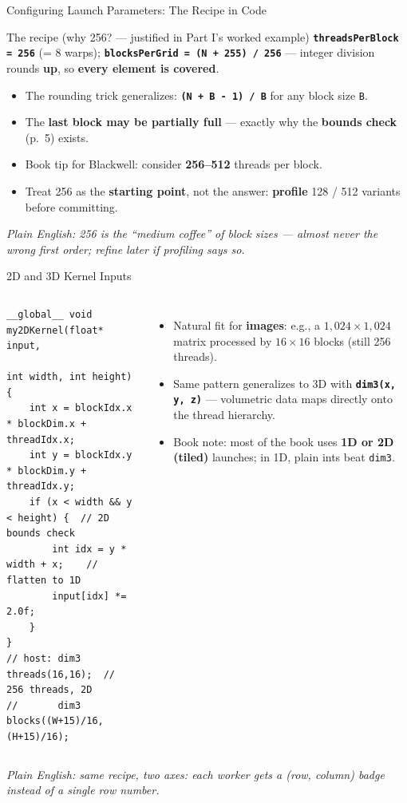 \documentclass[aspectratio=169]{beamer}
\newcommand{\kw}[1]{\textbf{\textcolor{kwblue}{#1}}}
\newcommand{\pe}[1]{\par{\setlength{\fboxsep}{2.5pt}\noindent\colorbox{navy!9}{\parbox{\dimexpr\textwidth-5pt\relax}{\footnotesize\itshape Plain English: #1}}}}
\begin{document}
\begin{frame}{Configuring Launch Parameters: The Recipe in Code}
  \begin{block}{The recipe (why 256? --- justified in Part I's worked example)}
    \kw{\texttt{threadsPerBlock = 256}} (= 8 warps);\quad
    \kw{\texttt{blocksPerGrid = (N + 255) / 256}} --- integer division rounds \kw{up},
    so \kw{every element is covered}.
  \end{block}
  \begin{itemize}
    \item The rounding trick generalizes: \kw{\texttt{(N + B - 1) / B}} for any block size \texttt{B}.
    \item The \kw{last block may be partially full} --- exactly why the
          \kw{bounds check} (p.~5) exists.
    \item Book tip for Blackwell: consider \kw{256--512} threads per block.
    \item Treat 256 as the \kw{starting point}, not the answer:
          \kw{profile} 128 / 512 variants before committing.
  \end{itemize}
  \pe{256 is the ``medium coffee'' of block sizes --- almost never the wrong first order; refine later if profiling says so.}
\end{frame}
\begin{frame}[fragile]{2D and 3D Kernel Inputs}
  \begin{columns}[t]
\begin{lstlisting}
__global__ void my2DKernel(float* input,
                           int width, int height) {
    int x = blockIdx.x * blockDim.x + threadIdx.x;
    int y = blockIdx.y * blockDim.y + threadIdx.y;
    if (x < width && y < height) {  // 2D bounds check
        int idx = y * width + x;    // flatten to 1D
        input[idx] *= 2.0f;
    }
}
// host: dim3 threads(16,16);  // 256 threads, 2D
//       dim3 blocks((W+15)/16, (H+15)/16);
\end{lstlisting}
    \begin{itemize}
      \item Natural fit for \kw{images}: e.g., a $1{,}024 \times 1{,}024$ matrix processed by
            $16 \times 16$ blocks (still 256 threads).
      \item Same pattern generalizes to 3D with \kw{\texttt{dim3(x, y, z)}} ---
            volumetric data maps directly onto the thread hierarchy.
      \item Book note: most of the book uses \kw{1D or 2D (tiled)} launches;
            in 1D, plain ints beat \texttt{dim3}.
    \end{itemize}
  \end{columns}
  \pe{same recipe, two axes: each worker gets a (row, column) badge instead of a single row number.}
\end{frame}
\end{document}
